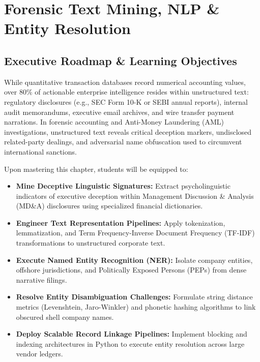 \chapter{Forensic Text Mining, NLP \& Entity Resolution}

\section{Executive Roadmap \& Learning Objectives}

While quantitative transaction databases record numerical accounting values, over $80\%$ of actionable enterprise intelligence resides within unstructured text: regulatory disclosures (e.g., SEC Form 10-K or SEBI annual reports), internal audit memorandums, executive email archives, and wire transfer payment narrations. In forensic accounting and Anti-Money Laundering (AML) investigations, unstructured text reveals critical deception markers, undisclosed related-party dealings, and adversarial name obfuscation used to circumvent international sanctions.

\begin{tcolorbox}[colback=primarylight, colframe=primarydark, title={\textbf{Core Learning Competencies}}]
Upon mastering this chapter, students will be equipped to:
\begin{itemize}
    \item \textbf{Mine Deceptive Linguistic Signatures:} Extract psycholinguistic indicators of executive deception within Management Discussion \& Analysis (MD\&A) disclosures using specialized financial dictionaries.
    \item \textbf{Engineer Text Representation Pipelines:} Apply tokenization, lemmatization, and Term Frequency-Inverse Document Frequency (TF-IDF) transformations to unstructured corporate text.
    \item \textbf{Execute Named Entity Recognition (NER):} Isolate company entities, offshore jurisdictions, and Politically Exposed Persons (PEPs) from dense narrative filings.
    \item \textbf{Resolve Entity Disambiguation Challenges:} Formulate string distance metrics (Levenshtein, Jaro-Winkler) and phonetic hashing algorithms to link obscured shell company names.
    \item \textbf{Deploy Scalable Record Linkage Pipelines:} Implement blocking and indexing architectures in Python to execute entity resolution across large vendor ledgers.
\end{itemize}
\end{tcolorbox}

